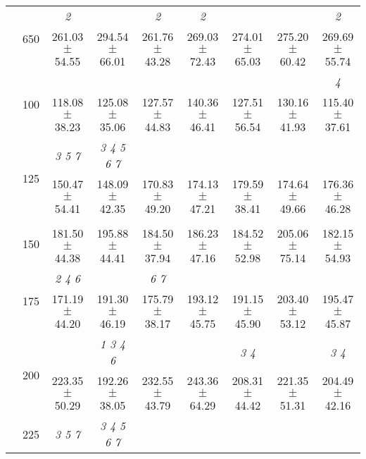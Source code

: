 \begin{table}[h]
{\begin{tabular}{
        ccccccccc}
 & \multirow{2}{*}{650}& \textit{ 2 }& & \textit{ 2 }& \textit{ 2 }& & & \textit{ 2 } \\ 
 & & 261.03 $\pm$ 54.55& 294.54 $\pm$ 66.01& 261.76 $\pm$ 43.28& 269.03 $\pm$ 72.43& 274.01 $\pm$ 65.03& 275.20 $\pm$ 60.42& 269.69 $\pm$ 55.74 \\ \midrule 
 & \multirow{2}{*}{100}& & & & & & & \textit{ 4 } \\ 
 & & 118.08 $\pm$ 38.23& 125.08 $\pm$ 35.06& 127.57 $\pm$ 44.83& 140.36 $\pm$ 46.41& 127.51 $\pm$ 56.54& 130.16 $\pm$ 41.93& 115.40 $\pm$ 37.61 \\ 
 & \multirow{2}{*}{125}& \cellcolor[HTML]{EFEFEF} \textit{ 3 5 7 }& \cellcolor[HTML]{EFEFEF} \textit{ 3 4 5 6 7 }& \cellcolor[HTML]{EFEFEF} & \cellcolor[HTML]{EFEFEF} & \cellcolor[HTML]{EFEFEF} & \cellcolor[HTML]{EFEFEF} & \cellcolor[HTML]{EFEFEF}  \\ 
 & & \cellcolor[HTML]{EFEFEF} 150.47 $\pm$ 54.41& \cellcolor[HTML]{EFEFEF} 148.09 $\pm$ 42.35& \cellcolor[HTML]{EFEFEF} 170.83 $\pm$ 49.20& \cellcolor[HTML]{EFEFEF} 174.13 $\pm$ 47.21& \cellcolor[HTML]{EFEFEF} 179.59 $\pm$ 38.41& \cellcolor[HTML]{EFEFEF} 174.64 $\pm$ 49.66& \cellcolor[HTML]{EFEFEF} 176.36 $\pm$ 46.28 \\ 
 & \multirow{2}{*}{150}& & & & & & &  \\ 
 & & 181.50 $\pm$ 44.38& 195.88 $\pm$ 44.41& 184.50 $\pm$ 37.94& 186.23 $\pm$ 47.16& 184.52 $\pm$ 52.98& 205.06 $\pm$ 75.14& 182.15 $\pm$ 54.93 \\ 
 & \multirow{2}{*}{175}& \cellcolor[HTML]{EFEFEF} \textit{ 2 4 6 }& \cellcolor[HTML]{EFEFEF} & \cellcolor[HTML]{EFEFEF} \textit{ 6 7 }& \cellcolor[HTML]{EFEFEF} & \cellcolor[HTML]{EFEFEF} & \cellcolor[HTML]{EFEFEF} & \cellcolor[HTML]{EFEFEF}  \\ 
 & & \cellcolor[HTML]{EFEFEF} 171.19 $\pm$ 44.20& \cellcolor[HTML]{EFEFEF} 191.30 $\pm$ 46.19& \cellcolor[HTML]{EFEFEF} 175.79 $\pm$ 38.17& \cellcolor[HTML]{EFEFEF} 193.12 $\pm$ 45.75& \cellcolor[HTML]{EFEFEF} 191.15 $\pm$ 45.90& \cellcolor[HTML]{EFEFEF} 203.40 $\pm$ 53.12& \cellcolor[HTML]{EFEFEF} 195.47 $\pm$ 45.87 \\ 
 & \multirow{2}{*}{200}& & \textit{ 1 3 4 6 }& & & \textit{ 3 4 }& & \textit{ 3 4 } \\ 
 & & 223.35 $\pm$ 50.29& 192.26 $\pm$ 38.05& 232.55 $\pm$ 43.79& 243.36 $\pm$ 64.29& 208.31 $\pm$ 44.42& 221.35 $\pm$ 51.31& 204.49 $\pm$ 42.16 \\ 
 & \multirow{2}{*}{225}& \cellcolor[HTML]{EFEFEF} \textit{ 3 5 7 }& \cellcolor[HTML]{EFEFEF} \textit{ 3 4 5 6 7 }& \cellcolor[HTML]{EFEFEF} & \cellcolor[HTML]{EFEFEF} & \cellcolor[HTML]{EFEFEF} & \cellcolor[HTML]{EFEFEF} & \cellcolor[HTML]{EFEFEF}  \\ 

\end{tabular}}
\end{table}

